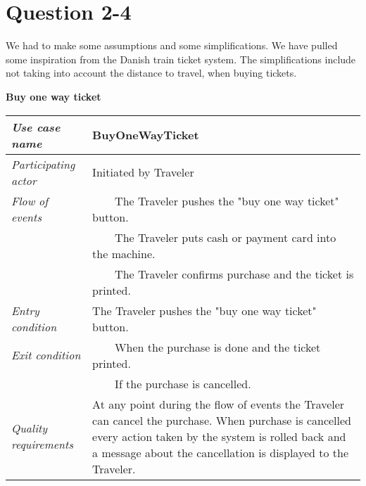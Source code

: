 \documentclass[10pt]{report}
\newcommand{\tabitem}{~~\llap{\textbullet}~~}
\numberwithin{equation}{section} %
\numberwithin{figure}{section} %
\numberwithin{table}{section} %
\begin{document}
\clearpage
\section{Question 2-4}
We had to make some assumptions and some simplifications. We have pulled some inspiration from the Danish train ticket system. The simplifications include not taking into account the distance to travel, when buying tickets.\\

\begin{table}[H]
\noindent \textbf{Buy one way ticket}\\
\begin{tabularx}{\textwidth}{l X}
\midrule
\textit{Use case name} & BuyOneWayTicket \\ \midrule
\textit{Participating actor} & Initiated by Traveler \\ \midrule
\textit{Flow of events} & \tabitem The Traveler pushes the "buy one way ticket" button.\\
						& \tabitem The Traveler puts cash or payment card into the machine.\\
                        & \tabitem The Traveler confirms purchase and the ticket is printed.\\
                        \midrule
\textit{Entry condition} & The Traveler pushes the "buy one way ticket" button.\\ \midrule
\textit{Exit condition} & \tabitem When the purchase is done and the ticket printed. \\
						& \tabitem If the purchase is cancelled.\\
                        \midrule
\textit{Quality requirements} & At any point during the flow of events the Traveler can cancel the purchase. When purchase is cancelled every action taken by the system is rolled back and a message about the cancellation is displayed to the Traveler. \\ \midrule
\end{tabularx}
\end{table}
\end{document}
